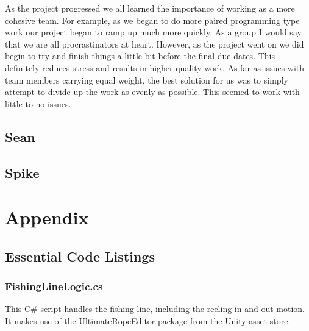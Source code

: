 \documentclass[10pt,journal,compsoc,onecolumn, draftclsnofoot]{IEEEtran}
\begin{document}
As the project progressed we all learned the importance of working as a more cohesive team. For example, as we began to do more paired programming type work our project began to ramp up much more quickly. As a group I would say that we are all procrastinators at heart. However, as the project went on we did begin to try and finish things a little bit before the final due dates. This definitely reduces stress and results in higher quality work. As far as issues with team members carrying equal weight, the best solution for us was to simply attempt to divide up the work as evenly as possible. This seemed to work with little to no issues.

\subsection{Sean}

\subsection{Spike}

\clearpage
\section{Appendix}
\subsection{Essential Code Listings}
\subsubsection{FishingLineLogic.cs}
This C\# script handles the fishing line, including the reeling in and out motion. It makes use of the UltimateRopeEditor package from the Unity asset store. \\
\end{document}
